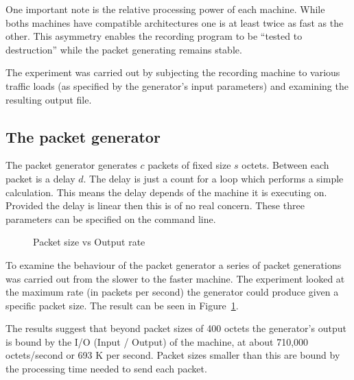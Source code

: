 One important note is the relative processing power of each machine.
While boths machines have compatible architectures one is at least
twice as fast as the other.  This asymmetry enables the recording
program to be ``tested to destruction'' while the packet generating
remains stable.

The experiment was carried out by subjecting the recording machine to
various traffic loads (as specified by the generator's input
parameters) and examining the resulting output file.

\subsection{The packet generator}

The packet generator generates $c$ packets of fixed size $s$ octets.
Between each packet is a delay $d$.  The delay is just a count for a
loop which performs a simple calculation.  This means the delay
depends of the machine it is executing on.  Provided the delay is
linear then this is of no real concern.  These three parameters can be
specified on the command line.

\begin{figure}
\leavevmode
{}
\caption{Packet size vs Output rate}
\label{Expr:fig1}
\end{figure}

To examine the behaviour of the packet generator a series of packet
generations was carried out from the slower to the faster machine.
The experiment looked at the maximum rate (in packets per second) the
generator could produce given a specific packet size.  The result can
be seen in Figure~\ref{Expr:fig1}.

The results suggest that beyond packet sizes of 400 octets the
generator's output is bound by the I/O (Input / Output) of the
machine, at about 710,000 octets/second or 693 K per second.  Packet
sizes smaller than this are bound by the processing time needed to
send each packet.



